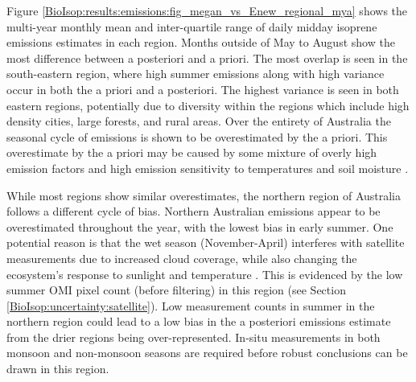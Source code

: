     
    
    
    Figure \ref{BioIsop:results:emissions:fig_megan_vs_Enew_regional_mya} shows the multi-year monthly mean and inter-quartile range of daily midday isoprene emissions estimates in each region. 
    Months outside of May to August show the most difference between a posteriori and a priori.
    The most overlap is seen in the south-eastern region, where high summer emissions along with high variance occur in both the a priori and a posteriori.
    The highest variance is seen in both eastern regions, potentially due to diversity within the regions which include high density cities, large forests, and rural areas.
    Over the entirety of Australia the seasonal cycle of emissions is shown to be overestimated by the a priori.
    This overestimate by the a priori may be caused by some mixture of overly high emission factors and high emission sensitivity to temperatures and soil moisture \parencite{Emmerson2016,Emmerson2019}.
    
    While most regions show similar overestimates, the northern region of Australia follows a different cycle of bias.
    Northern Australian emissions appear to be overestimated throughout the year, with the lowest bias in early summer.
    One potential reason is that the wet season (November-April) interferes with satellite measurements due to increased cloud coverage, while also changing the ecosystem's response to sunlight and temperature \parencite[e.g.,][]{Surl2018}.
    This is evidenced by the low summer OMI pixel count (before filtering) in this region (see Section \ref{BioIsop:uncertainty:satellite}).
    Low measurement counts in summer in the northern region could lead to a low bias in the a posteriori emissions estimate from the drier regions being over-represented.
    In-situ measurements in both monsoon and non-monsoon seasons are required before robust conclusions can be drawn in this region.
    
